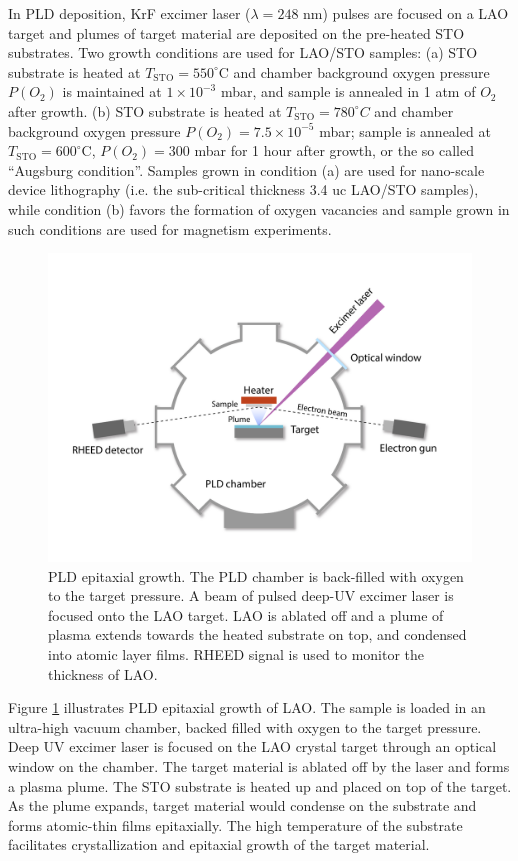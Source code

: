 \documentclass[pdflatex, sectionletters, 12pt]{pittetd}    %
\begin{document}
In PLD deposition, KrF excimer laser ($\lambda = 248$ nm) pulses are focused on a LAO target and plumes of target material are deposited on the pre-heated STO substrates. Two growth conditions are used for LAO/STO samples: (a) STO substrate is heated at $T_\mathrm{STO} = 550^{\circ}$C and chamber background oxygen pressure $P(O_2)$ is maintained at $1 \times 10^{-3}$ mbar, and sample is annealed in 1 atm of $O_2$ after growth. (b) STO substrate is heated at $T_\mathrm{STO} = 780^{\circ}C$ and chamber background oxygen pressure $P(O_2) = 7.5 \times 10^{-5}$ mbar; sample is annealed at $T_\mathrm{STO} = 600^{\circ}$C, $P(O_2) = 300$ mbar for 1 hour after growth, or the so called ``Augsburg condition''. Samples grown in condition (a) are used for nano-scale device lithography (i.e. the sub-critical thickness 3.4 uc LAO/STO samples), while condition (b) favors the formation of oxygen vacancies and sample grown in such conditions are used for magnetism experiments\cite{bi2014room}. 

\begin{figure}[p]
	\centering
	\includegraphics[width=1.0\textwidth]{Drawing/PLD.pdf}
	\caption{PLD epitaxial growth. The PLD chamber is back-filled with oxygen to the target pressure. A beam of pulsed deep-UV excimer laser is focused onto the LAO target. LAO is ablated off and a plume of plasma extends towards the heated substrate on top, and condensed into atomic layer films. RHEED signal is used to monitor the thickness of LAO.}
	\label{FIG:PLD}
\end{figure}

Figure \ref{FIG:PLD} illustrates PLD epitaxial growth of LAO. The sample is loaded in an ultra-high vacuum chamber, backed filled with oxygen to the target pressure. Deep UV excimer laser is focused on the LAO crystal target through an optical window on the chamber. The target material is ablated off by the laser and forms a plasma plume. The STO substrate is heated up and placed on top of the target. As the plume expands, target material would condense on the substrate and forms atomic-thin films epitaxially. The high temperature of the substrate facilitates crystallization and epitaxial growth of the target material. 
\\
\end{document}
